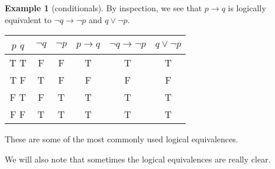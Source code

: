 \documentclass[letterpaper,10pt]{article}
\theoremstyle{plain}
\theoremstyle{definition}
\newtheorem{exmp}[thm]{Example}
\theoremstyle{remark}
\providecommand{\lor}{\ensuremath{\vee}}
\begin{document}
\begin{exmp}[conditionals]
By inspection, we see that $p \to q$ is logically equivalent to $\lnot q \to \lnot p$ and $q \lor \lnot p$.


\begin{center} 
\begin{tabular}{ | c | c | c |c |c |c |} 
  \hline
 $p$ $q$ & $ \lnot q$ & $\lnot p$ & $p \to q $ & $\lnot q \to \lnot p$ & $q \lor \lnot p$ \\
 \hline
  T T &F  &F&T&T&T\\ 
  T F & T & F&F&F&F\\ 
  F T & F & T&T&T&T \\ 
  F F &  T& T&T&T&T\\ 
  \hline
\end{tabular}
\end{center}
\end{exmp}
These are some of the most commonly used logical equivalences. 

We will also note that sometimes the logical equivalences are really clear.
\end{document}
